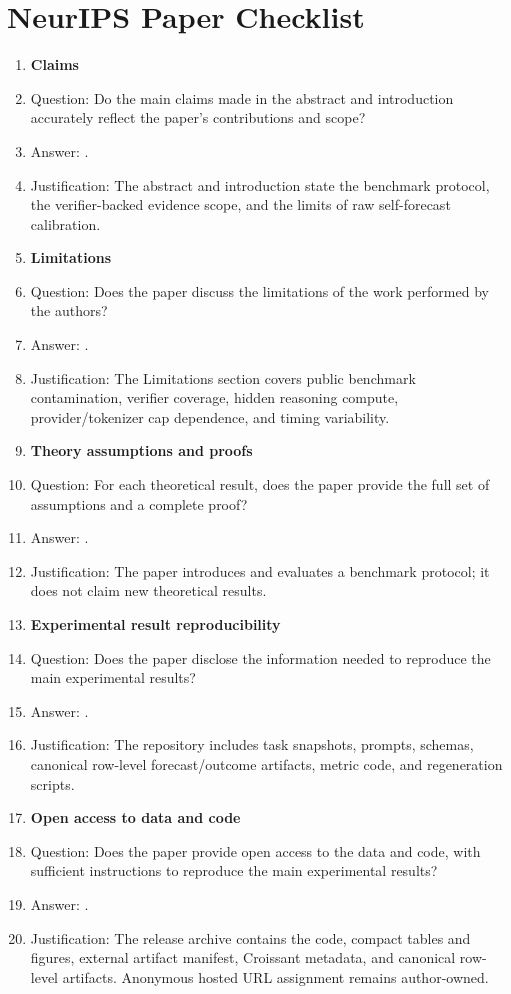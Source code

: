 \section*{NeurIPS Paper Checklist}

\begin{enumerate}

\item {\bf Claims}
    \item[] Question: Do the main claims made in the abstract and introduction accurately reflect the paper's contributions and scope?
    \item[] Answer: \answerYes{}.
    \item[] Justification: The abstract and introduction state the benchmark protocol, the verifier-backed evidence scope, and the limits of raw self-forecast calibration.

\item {\bf Limitations}
    \item[] Question: Does the paper discuss the limitations of the work performed by the authors?
    \item[] Answer: \answerYes{}.
    \item[] Justification: The Limitations section covers public benchmark contamination, verifier coverage, hidden reasoning compute, provider/tokenizer cap dependence, and timing variability.

\item {\bf Theory assumptions and proofs}
    \item[] Question: For each theoretical result, does the paper provide the full set of assumptions and a complete proof?
    \item[] Answer: \answerNA{}.
    \item[] Justification: The paper introduces and evaluates a benchmark protocol; it does not claim new theoretical results.

\item {\bf Experimental result reproducibility}
    \item[] Question: Does the paper disclose the information needed to reproduce the main experimental results?
    \item[] Answer: \answerYes{}.
    \item[] Justification: The repository includes task snapshots, prompts, schemas, canonical row-level forecast/outcome artifacts, metric code, and regeneration scripts.

\item {\bf Open access to data and code}
    \item[] Question: Does the paper provide open access to the data and code, with sufficient instructions to reproduce the main experimental results?
    \item[] Answer: \answerYes{}.
    \item[] Justification: The release archive contains the code, compact tables and figures, external artifact manifest, Croissant metadata, and canonical row-level artifacts. Anonymous hosted URL assignment remains author-owned.


\end{enumerate}
